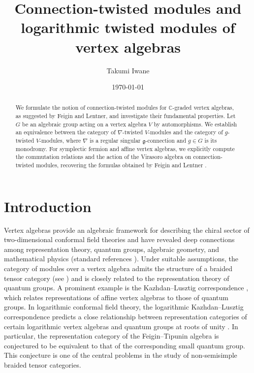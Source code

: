 \documentclass[final,reqno]{amsart}
\begin{document}
\title{Connection-twisted modules and logarithmic twisted modules of vertex algebras}
\author{Takumi Iwane}
\date{\today}
\address{Graduate School of Mathematics, Nagoya University.
 Furocho, Chikusaku, Nagoya, Japan, 464-8602.}
\begin{abstract}
    We formulate the notion of connection-twisted modules for $\mathbb{C}$-graded vertex algebras, as suggested by Feigin and Lentner, and investigate their fundamental properties. Let $G$ be an algebraic group acting on a vertex algebra $V$ by automorphisms. We establish an equivalence between the category of $\nabla$-twisted $V$-modules and the category of $g$-twisted $V$-modules, where $\nabla$ is a regular singular $\mathfrak{g}$-connection and $g\in G$ is its monodromy. For symplectic fermion and affine vertex algebras, we explicitly compute the commutation relations and the action of the Virasoro algebra on connection-twisted modules, recovering the formulas obtained by Feigin and Lentner \cite{FL24,FL25}.    
\end{abstract}


\maketitle





\section{Introduction}

Vertex algebras provide an algebraic framework for describing the chiral sector of two-dimensional conformal field theories and have revealed deep connections among representation theory, quantum groups, algebraic geometry, and mathematical physics (standard references \cite{Kac98,LL04,FBZ04}). Under suitable assumptions, the category of modules over a vertex algebra admits the structure of a braided tensor category (see \cite{HL13}) and is closely related to the representation theory of quantum groups. A prominent example is the Kazhdan--Lusztig correspondence \cite{KL93,KL94}, which relates representations of affine vertex algebras to those of quantum groups. In logarithmic conformal field theory, the logarithmic Kazhdan--Lusztig correspondence predicts a close relationship between representation categories of certain logarithmic vertex algebras and quantum groups at roots of unity \cite{FGST06,CLR21,CLR23}. In particular, the representation category of the Feigin–Tipunin algebra is conjectured to be equivalent to that of the corresponding small quantum group. This conjecture is one of the central problems in the study of non-semisimple braided tensor categories.
\end{document}
